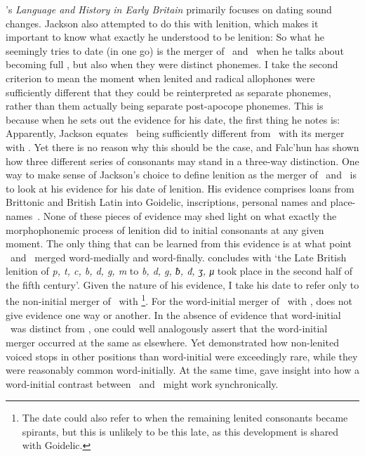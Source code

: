 \Textcite{jackson_language_1953}'s \emph{Language and History in Early Britain} primarily focuses on dating sound changes. Jackson also attempted to do this with lenition, which makes it important to know what exactly he understood to be lenition:
So what he seemingly tries to date (in one go) is the merger of \lT\ and \xD\ when he talks about  becoming full , but also when they were distinct phonemes. I take the second criterion to mean the moment when lenited and radical allophones were sufficiently different that they could be reinterpreted as separate phonemes, rather than them actually being separate post-apocope phonemes. This is because when he sets out the evidence for his date, the first thing he notes is:
Apparently, Jackson equates  \lT\ being sufficiently different from \xT\ with its merger with \xD. Yet there is no reason why this should be the case, and Falc'hun has shown how three different series of consonants may stand in a three-way distinction. One way to make sense of Jackson's choice to define lenition as the merger of \lT\ and \xD\  is to look at his evidence for his date of lenition. His evidence comprises loans from Brittonic and British Latin into Goidelic, inscriptions, personal names and place-names~\autocite[§§~133–134]{jackson_language_1953}. None of these pieces of evidence may shed light on what exactly the morphophonemic process of lenition did to initial consonants at any given moment. The only thing that can be learned from this evidence is at what point \lT\ and \xD\ merged word-medially and word-finally. \Textcite[§~142]{jackson_language_1953} concludes with `the Late British lenition of \textit{p, t, c, b, d, g, m} to \textit{b, d, g, ƀ, đ, ʒ, μ} took place in the second half of the fifth century'. Given the nature of his evidence, I take his date to refer only to the non-initial merger of \lT\ with \xD\footnote{The date could also refer to when the remaining lenited consonants became spirants, but this is unlikely to be this late, as this development is shared with Goidelic.}. For the word-initial merger of \lT\ with \xD, \textcite{jackson_language_1953} does not give evidence one way or another. In the absence of evidence that word-initial \lT\ was distinct from \xD, one could well analogously assert that the word-initial merger occurred at the same as elsewhere. Yet \textcite{martinet_celtic_1952} demonstrated how non-lenited voiced stops in other positions than word-initial were exceedingly rare, while they were reasonably common word-initially. At the same time, \textcite{falchun_systeme_1951} gave insight into how a word-initial contrast between \xD\ and \lT\ might work synchronically. 



